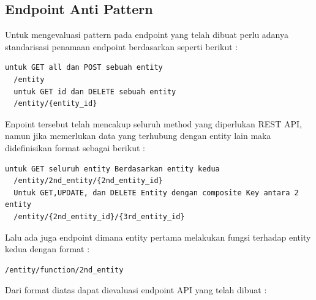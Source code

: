 \subsection{Endpoint Anti Pattern}
Untuk mengevaluasi pattern pada endpoint yang telah dibuat perlu adanya standarisasi penamaan endpoint berdasarkan \cite{cs7194} seperti berikut :
\begin{lstlisting}[caption={Format penamaan endpoint dasar},label={lst:endpoint1level}]
  untuk GET all dan POST sebuah entity
  /entity
  untuk GET id dan DELETE sebuah entity
  /entity/{entity_id}
\end{lstlisting}
Enpoint tersebut telah mencakup seluruh method yang diperlukan REST API, namun jika memerlukan data yang terhubung dengan entity lain maka didefinisikan format sebagai berikut :
\begin{lstlisting}[caption={Format penamaan endpoint entity from entity},label={lst:endpoint2level}]
  untuk GET seluruh entity Berdasarkan entity kedua
  /entity/2nd_entity/{2nd_entity_id}
  Untuk GET,UPDATE, dan DELETE Entity dengan composite Key antara 2 entity
  /entity/{2nd_entity_id}/{3rd_entity_id}
\end{lstlisting}
Lalu ada juga endpoint dimana entity pertama melakukan fungsi terhadap entity kedua dengan format :
\begin{lstlisting}[caption={Format penamaan endpoint entity function to entity},label={lst:endpointfunction}]
  /entity/function/2nd_entity
\end{lstlisting}
Dari format diatas dapat dievaluasi endpoint API yang telah dibuat :

